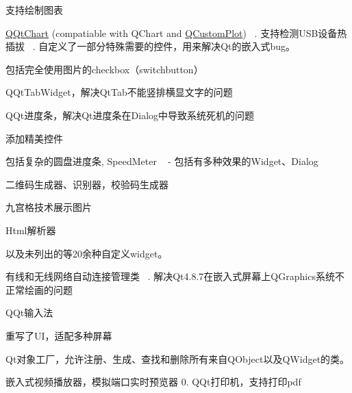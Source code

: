 
\begin{DoxyEnumerate}
\item 支持绘制图表
\begin{DoxyItemize}
\item \mbox{\hyperlink{class_q_qt_chart}{Q\+Qt\+Chart}} (compatiable with Q\+Chart and \mbox{\hyperlink{class_q_custom_plot}{Q\+Custom\+Plot}}) ~. 支持检测\+U\+S\+B设备热插拔 ~. 自定义了一部分特殊需要的控件，用来解决\+Qt的嵌入式bug。
\item 包括完全使用图片的checkbox（switchbutton）
\item Q\+Qt\+Tab\+Widget，解决\+Qt\+Tab不能竖排横显文字的问题
\item Q\+Qt进度条，解决\+Qt进度条在\+Dialog中导致系统死机的问题
\end{DoxyItemize}
\end{DoxyEnumerate}
\begin{DoxyEnumerate}
\item 添加精美控件
\begin{DoxyItemize}
\item 包括复杂的圆盘进度条, Speed\+Meter ~\newline
 -\/ 包括有多种效果的\+Widget、\+Dialog
\item 二维码生成器、识别器，校验码生成器
\item 九宫格技术展示图片
\item Html解析器
\item 以及未列出的等20余种自定义widget。
\end{DoxyItemize}
\item 有线和无线网络自动连接管理类 ~. 解决\+Qt4.8.\+7在嵌入式屏幕上\+Q\+Graphics系统不正常绘画的问题
\item Q\+Qt输入法
\begin{DoxyItemize}
\item 重写了\+U\+I，适配多种屏幕
\end{DoxyItemize}
\item Qt对象工厂，允许注册、生成、查找和删除所有来自\+Q\+Object以及\+Q\+Widget的类。
\item 嵌入式视频播放器，模拟端口实时预览器 0. Q\+Qt打印机，支持打印pdf
\end{DoxyEnumerate}
